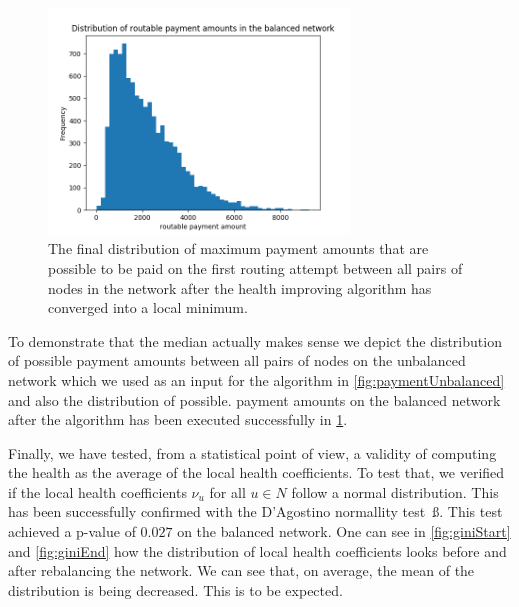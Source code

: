 \documentclass[a4paper]{paper}
\begin{document}
\begin{figure}
 \centering
 \includegraphics[width=8cm]{code/results/routabilityTest/paymentamtBalanced.png}
 \caption{The final distribution of maximum payment amounts that are possible to be paid on the first routing attempt between all pairs of nodes in the network after the health improving algorithm has converged into a local minimum.}
 \label{fig:paymentBalanced}
\end{figure}

To demonstrate that the median actually makes sense we depict the distribution of possible payment amounts between all pairs of nodes on the unbalanced network which we used as an input for the algorithm in \cref{fig:paymentUnbalanced} and also the distribution of possible. payment amounts on the balanced network after the algorithm has been executed successfully in \cref{fig:paymentBalanced}.

Finally, we have tested, from a statistical point of view, a validity of computing the health as the average of the local health coefficients.
To test that, we verified if the local health coefficients $\nu_u$ for all $u \in N$ follow a normal distribution. This has been successfully confirmed with the D'Agostino normallity test~ß\cite{d1971omnibus}.
This test achieved a p-value of $0.027$ on the balanced network.
One can see in \cref{fig:giniStart} and \cref{fig:giniEnd} how the distribution of local health coefficients looks before and after rebalancing the network. We can see that, on average, the mean of the distribution is being decreased. This is to be expected. 
\end{document}
